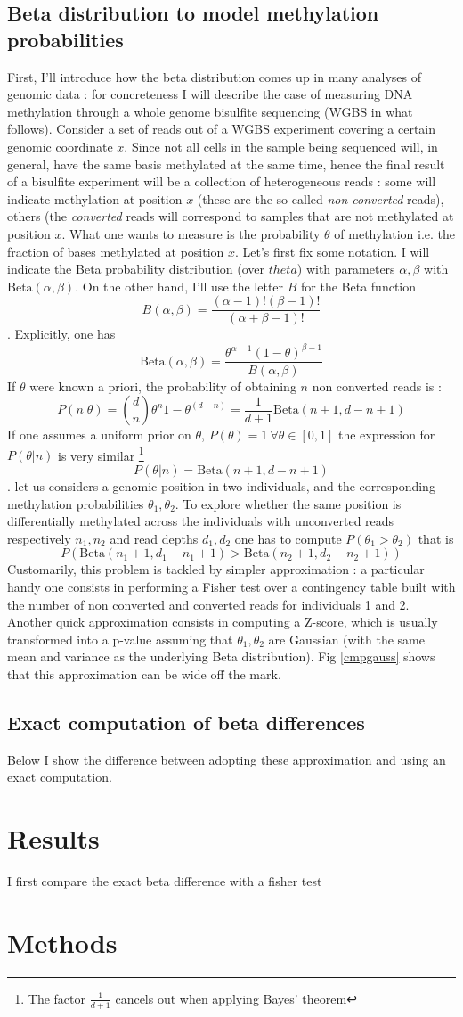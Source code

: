 \documentclass{amsart}
\begin{document}
\subsection{Beta distribution to model methylation probabilities}
First, I'll introduce how the beta distribution comes up in many analyses of genomic data : for concreteness I will describe the case of measuring DNA methylation through a whole genome bisulfite sequencing (WGBS in what follows). 
Consider a set of reads out of a WGBS experiment covering a certain genomic coordinate $x$. Since not all cells in the sample being sequenced will, in general,  have the same basis methylated at the same time, hence the final result of a bisulfite experiment will be a collection of heterogeneous reads : some will indicate methylation at position $x$ (these are the so called {\em non converted} reads), others (the {\em converted} reads will correspond to samples that are not methylated at position $x$. What one wants to measure is the probability $\theta$ of methylation i.e. the fraction of bases methylated at position $x$. Let's first fix some notation. I will indicate the Beta probability distribution (over $theta$) with parameters $\alpha,\beta$ with $\mbox{Beta}(\alpha,\beta)$. On the other hand, I'll use the letter $B$ for the Beta function 
\[B(\alpha,\beta)=\frac{(\alpha-1)!(\beta-1)!}{(\alpha+\beta-1)!}\]. Explicitly, one has \[\mbox{Beta}(\alpha,\beta)=\frac{\theta^{\alpha-1}(1-\theta)^{\beta-1}}{B(\alpha,\beta)}\] If $\theta$ were known a priori, the probability of obtaining $n$ non converted reads is :
\[P(n|\theta)={d \choose n}\theta^n {1-\theta}^(d-n)=\frac{1}{d+1}\mbox{Beta}(n+1,d-n+1)\]
If one assumes a uniform prior on $\theta$, $P(\theta)=1 \ \forall \theta \in [0,1]$ the expression for $P(\theta|n)$ is very similar \footnote{The factor $\frac{1}{d+1}$ cancels out when applying Bayes' theorem}
\[P(\theta|n)=\mbox{Beta}(n+1,d-n+1)\].
let us considers a genomic position in two individuals, and the corresponding methylation probabilities $\theta_1,\theta_2$. 
To explore whether the same position is differentially methylated across the individuals with unconverted reads respectively $n_1,n_2$ and read depths $d_1,d_2$ one
has to compute $P(\theta_1>\theta_2)$ that is \[P(\mbox{Beta}(n_1+1,d_1-n_1+1)>\mbox{Beta}(n_2+1,d_2-n_2+1))\] 
Customarily, this problem is tackled by simpler approximation : a particular handy one consists in performing a Fisher test over a contingency table built with the number of non converted and converted reads for individuals 1 and 2. Another quick approximation consists in computing a Z-score, which is usually transformed into a p-value assuming that $\theta_1,\theta_2$ are Gaussian (with the same mean and variance as the underlying Beta distribution).  Fig \ref{cmpgauss} shows that this approximation can be wide off the mark.
\subsection{Exact computation of beta differences}


Below I show the difference between adopting these approximation and using an exact computation.
\section{Results} 
I first compare the exact beta difference with a fisher test
\section{Methods}
\end{document}
